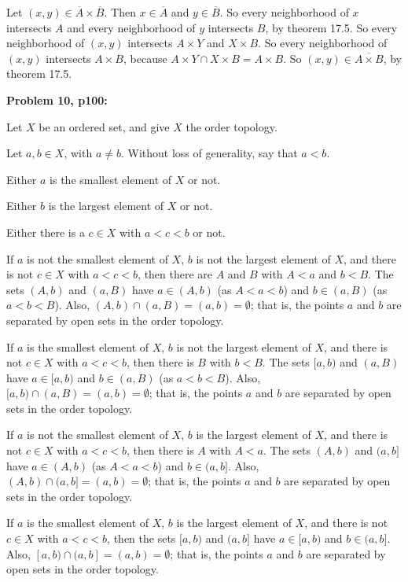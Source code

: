 \documentclass[a4paper,12pt]{article}
\begin{document}
Let $(x,y) \in \overline{A} \times \overline{B}$. Then $x \in \overline{A}$ and $y \in \overline{B}$. So every neighborhood of $x$ intersects $A$ and every neighborhood of $y$ intersects $B$, by theorem 17.5. So every neighborhood of $(x,y)$ intersects $A \times Y$ and $X \times B$. So every neighborhood of $(x,y)$ intersects $A \times B$, because $A \times Y \cap X \times B = A \times B$. So $(x,y) \in \overline{A \times B}$, by theorem 17.5.

\shunt

{\bf Problem 10, p100:}

Let $X$ be an ordered set, and give $X$ the order topology.

Let $a, b \in X$, with $a \neq b$. Without loss of generality, say that $a < b$.

Either $a$ is the smallest element of $X$ or not. 

Either $b$ is the largest element of $X$ or not.

Either there is a $c \in X$ with $a < c < b$ or not.

If $a$ is not the smallest element of $X$, $b$ is not the largest element of $X$, and there is not $c \in X$ with $a < c < b$, then there are $A$ and $B$ with $A< a$ and $b < B$. The sets $(A,b)$ and $(a,B)$ have $a \in (A,b)$ (as $A < a < b$) and $b \in (a,B)$ (as $a<b<B$). Also, $(A,b) \cap (a,B) = (a,b)=\emptyset$; that is, the points $a$ and $b$ are separated by open sets in the order topology. %

If $a$ is the smallest element of $X$, $b$ is not the largest element of $X$, and there is not $c \in X$ with $a < c < b$, then there is $B$ with $b < B$. The sets $[a,b)$ and $(a,B)$ have $a \in [a,b)$ and $b \in (a,B)$ (as $a<b<B$). Also, $[a,b) \cap (a,B) = (a,b)=\emptyset$; that is, the points $a$ and $b$ are separated by open sets in the order topology. %

If $a$ is not the smallest element of $X$, $b$ is the largest element of $X$, and there is not $c \in X$ with $a < c < b$, then there is $A$ with $A< a$. The sets $(A,b)$ and $(a,b]$ have $a \in (A,b)$ (as $A < a < b$) and $b \in (a,b]$. Also, $(A,b) \cap (a,b] = (a,b)= \emptyset$; that is, the points $a$ and $b$ are separated by open sets in the order topology. %

If $a$ is the smallest element of $X$, $b$ is the largest element of $X$, and there is not $c \in X$ with $a < c < b$, then the sets $[a,b)$ and $(a,b]$ have $a \in [a,b)$ and $b \in (a,b]$. Also, $[a,b) \cap (a,b] = (a,b)=\emptyset$; that is, the points $a$ and $b$ are separated by open sets in the order topology. %
\end{document}
